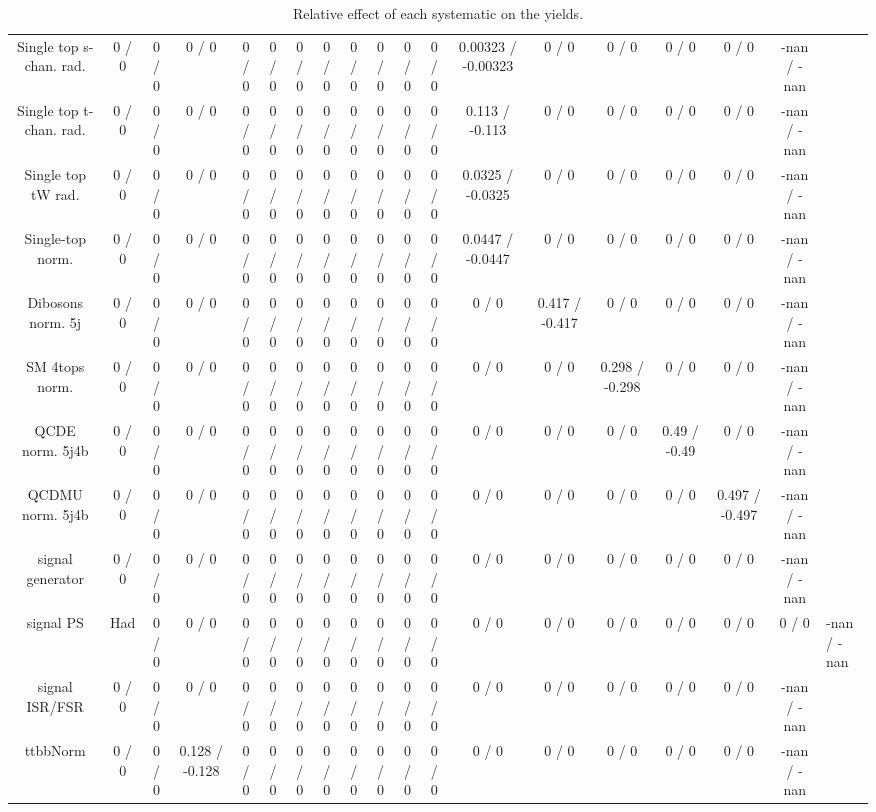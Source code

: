\documentclass[10pt]{article}
\begin{document}
\begin{table}[htbp]
\begin{center}
\begin{tabular}{|c|c|c|c|c|c|c|c|c|c|c|c|c|c|c|c|c|c|}
  Single top s-chan. rad. & 0 / 0 & 0 / 0 & 0 / 0 & 0 / 0 & 0 / 0 & 0 / 0 & 0 / 0 & 0 / 0 & 0 / 0 & 0 / 0 & 0 / 0 & 0.00323 / -0.00323 & 0 / 0 & 0 / 0 & 0 / 0 & 0 / 0 & -nan / -nan \\ 
  Single top t-chan. rad. & 0 / 0 & 0 / 0 & 0 / 0 & 0 / 0 & 0 / 0 & 0 / 0 & 0 / 0 & 0 / 0 & 0 / 0 & 0 / 0 & 0 / 0 & 0.113 / -0.113 & 0 / 0 & 0 / 0 & 0 / 0 & 0 / 0 & -nan / -nan \\ 
  Single top tW rad. & 0 / 0 & 0 / 0 & 0 / 0 & 0 / 0 & 0 / 0 & 0 / 0 & 0 / 0 & 0 / 0 & 0 / 0 & 0 / 0 & 0 / 0 & 0.0325 / -0.0325 & 0 / 0 & 0 / 0 & 0 / 0 & 0 / 0 & -nan / -nan \\ 
  Single-top norm. & 0 / 0 & 0 / 0 & 0 / 0 & 0 / 0 & 0 / 0 & 0 / 0 & 0 / 0 & 0 / 0 & 0 / 0 & 0 / 0 & 0 / 0 & 0.0447 / -0.0447 & 0 / 0 & 0 / 0 & 0 / 0 & 0 / 0 & -nan / -nan \\ 
  Dibosons norm. 5j & 0 / 0 & 0 / 0 & 0 / 0 & 0 / 0 & 0 / 0 & 0 / 0 & 0 / 0 & 0 / 0 & 0 / 0 & 0 / 0 & 0 / 0 & 0 / 0 & 0.417 / -0.417 & 0 / 0 & 0 / 0 & 0 / 0 & -nan / -nan \\ 
  SM 4tops norm. & 0 / 0 & 0 / 0 & 0 / 0 & 0 / 0 & 0 / 0 & 0 / 0 & 0 / 0 & 0 / 0 & 0 / 0 & 0 / 0 & 0 / 0 & 0 / 0 & 0 / 0 & 0.298 / -0.298 & 0 / 0 & 0 / 0 & -nan / -nan \\ 
  QCDE norm. 5j4b & 0 / 0 & 0 / 0 & 0 / 0 & 0 / 0 & 0 / 0 & 0 / 0 & 0 / 0 & 0 / 0 & 0 / 0 & 0 / 0 & 0 / 0 & 0 / 0 & 0 / 0 & 0 / 0 & 0.49 / -0.49 & 0 / 0 & -nan / -nan \\ 
  QCDMU norm. 5j4b & 0 / 0 & 0 / 0 & 0 / 0 & 0 / 0 & 0 / 0 & 0 / 0 & 0 / 0 & 0 / 0 & 0 / 0 & 0 / 0 & 0 / 0 & 0 / 0 & 0 / 0 & 0 / 0 & 0 / 0 & 0.497 / -0.497 & -nan / -nan \\ 
  signal generator & 0 / 0 & 0 / 0 & 0 / 0 & 0 / 0 & 0 / 0 & 0 / 0 & 0 / 0 & 0 / 0 & 0 / 0 & 0 / 0 & 0 / 0 & 0 / 0 & 0 / 0 & 0 / 0 & 0 / 0 & 0 / 0 & -nan / -nan \\ 
  signal PS & Had & 0 / 0 & 0 / 0 & 0 / 0 & 0 / 0 & 0 / 0 & 0 / 0 & 0 / 0 & 0 / 0 & 0 / 0 & 0 / 0 & 0 / 0 & 0 / 0 & 0 / 0 & 0 / 0 & 0 / 0 & 0 / 0 & -nan / -nan \\ 
  signal ISR/FSR & 0 / 0 & 0 / 0 & 0 / 0 & 0 / 0 & 0 / 0 & 0 / 0 & 0 / 0 & 0 / 0 & 0 / 0 & 0 / 0 & 0 / 0 & 0 / 0 & 0 / 0 & 0 / 0 & 0 / 0 & 0 / 0 & -nan / -nan \\ 
 ttbbNorm & 0 / 0 & 0 / 0 & 0.128 / -0.128 & 0 / 0 & 0 / 0 & 0 / 0 & 0 / 0 & 0 / 0 & 0 / 0 & 0 / 0 & 0 / 0 & 0 / 0 & 0 / 0 & 0 / 0 & 0 / 0 & 0 / 0 & -nan / -nan \\ 
\hline 
\end{tabular} 
\caption{Relative effect of each systematic on the yields.} 
\end{center} 
\end{table} 
\end{document}

